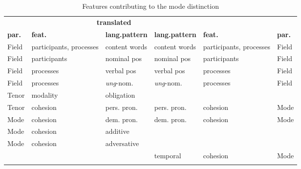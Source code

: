 \documentclass[output=paper,colorlinks,citecolor=brown]{langscibook}
\begin{document}
\begin{table}
    \small
\begin{tabular}{l@{~}p{1.75cm}p{1.95cm}@{\qquad}p{1.95cm}p{1.75cm}p{1cm}}
\lsptoprule
\multicolumn{3}{c}{\bf	non-translated} & \multicolumn{3}{c}{\bf translated}\\
\cmidrule(r){2-3}
\cmidrule(l){4-6}
\bf par. &\bf feat.&\bf lang.pattern &\bf lang.pattern &\bf feat. & \bf par.\\
\midrule
Field & participants, processes & content words &content words& participants, processes&Field\\
Field & participants & nominal pos & nominal pos & participants & Field\\
Field & processes & verbal pos & verbal pos & processes & Field\\
Field & processes & \textit{ung}-nom. & \textit{ung}-nom. & processes & Field\\
\rowcolor{gray!50}
Tenor &  modality& obligation&&&\\
Tenor & cohesion & pers. pron.&pers. pron.&cohesion &Mode\\
Mode & cohesion & dem. pron. &dem. pron.&cohesion &Mode \\  
\rowcolor{gray!50}
Mode & cohesion & additive&  & & \\
\rowcolor{gray!50}
Mode & cohesion & adversative &&&\\
\rowcolor{gray!30}
 &  & &temporal &cohesion&Mode\\
                                      \lspbottomrule
\end{tabular}
    \caption{Features contributing to the mode distinction}
    \label{tab:rq4}
\end{table}{}
\end{document}
